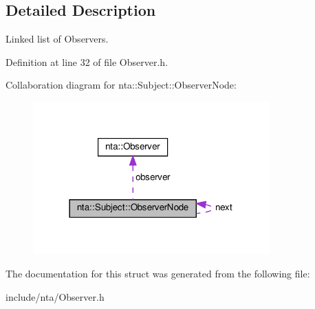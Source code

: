 \subsection{Detailed Description}
Linked list of Observers. 

Definition at line 32 of file Observer.\+h.



Collaboration diagram for nta\+:\+:Subject\+:\+:Observer\+Node\+:
\nopagebreak
\begin{figure}[H]
\begin{center}
\leavevmode
\includegraphics[width=258pt]{dd/dbe/structnta_1_1Subject_1_1ObserverNode__coll__graph}
\end{center}
\end{figure}


The documentation for this struct was generated from the following file\+:\begin{DoxyCompactItemize}
\item 
include/nta/Observer.\+h\end{DoxyCompactItemize}

